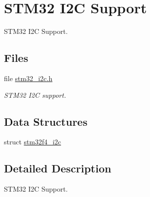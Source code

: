 \hypertarget{group__stm32__i2c}{}\section{S\+T\+M32 I2C Support}
\label{group__stm32__i2c}


S\+T\+M32 I2C Support.  


\subsection*{Files}
\begin{DoxyCompactItemize}
\item 
file \mbox{\hyperlink{stm32__i2c_8h}{stm32\+\_\+i2c.\+h}}
\begin{DoxyCompactList}\small\item\em S\+T\+M32 I2C support. \end{DoxyCompactList}\end{DoxyCompactItemize}
\subsection*{Data Structures}
\begin{DoxyCompactItemize}
\item 
struct \mbox{\hyperlink{structstm32f4__i2c}{stm32f4\+\_\+i2c}}
\end{DoxyCompactItemize}


\subsection{Detailed Description}
S\+T\+M32 I2C Support. 

